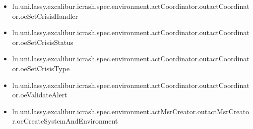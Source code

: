 \begin{itemize}
\item lu.uni.lassy.excalibur.icrash.spec.environment.actCoordinator.outactCoordinator.oeSetCrisisHandler 
\item lu.uni.lassy.excalibur.icrash.spec.environment.actCoordinator.outactCoordinator.oeSetCrisisStatus 
\item lu.uni.lassy.excalibur.icrash.spec.environment.actCoordinator.outactCoordinator.oeSetCrisisType 
\item lu.uni.lassy.excalibur.icrash.spec.environment.actCoordinator.outactCoordinator.oeValidateAlert 
\item lu.uni.lassy.excalibur.icrash.spec.environment.actMsrCreator.outactMsrCreator.oeCreateSystemAndEnvironment 
\end{itemize}








